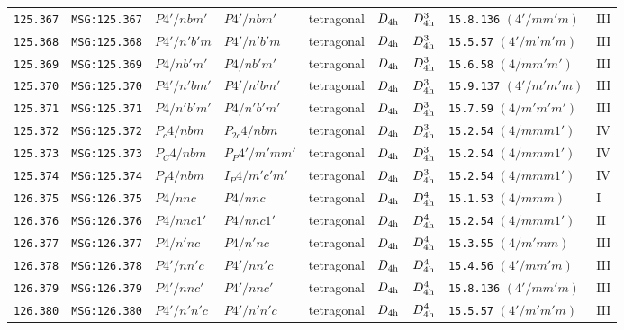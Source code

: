 \documentclass[fleqn,10pt]{jsarticle}
\begin{document}
\begin{center}
\begin{longtable}{lllllllll}
\texttt{125.367} & \texttt{MSG:125.367} & $P4'/nbm'$ & $P4'/nbm'$ & tetragonal & $D_{\rm 4h}$ & $D_{\rm 4h}^{3}$ & \texttt{15.8.136} $(4'/mm'm)$ & III \\
\texttt{125.368} & \texttt{MSG:125.368} & $P4'/n'b'm$ & $P4'/n'b'm$ & tetragonal & $D_{\rm 4h}$ & $D_{\rm 4h}^{3}$ & \texttt{15.5.57} $(4'/m'm'm)$ & III \\
\texttt{125.369} & \texttt{MSG:125.369} & $P4/nb'm'$ & $P4/nb'm'$ & tetragonal & $D_{\rm 4h}$ & $D_{\rm 4h}^{3}$ & \texttt{15.6.58} $(4/mm'm')$ & III \\
\texttt{125.370} & \texttt{MSG:125.370} & $P4'/n'bm'$ & $P4'/n'bm'$ & tetragonal & $D_{\rm 4h}$ & $D_{\rm 4h}^{3}$ & \texttt{15.9.137} $(4'/m'm'm)$ & III \\
\texttt{125.371} & \texttt{MSG:125.371} & $P4/n'b'm'$ & $P4/n'b'm'$ & tetragonal & $D_{\rm 4h}$ & $D_{\rm 4h}^{3}$ & \texttt{15.7.59} $(4/m'm'm')$ & III \\
\texttt{125.372} & \texttt{MSG:125.372} & $P_{c}4/nbm$ & $P_{2c}4/nbm$ & tetragonal & $D_{\rm 4h}$ & $D_{\rm 4h}^{3}$ & \texttt{15.2.54} $(4/mmm1')$ & IV \\
\texttt{125.373} & \texttt{MSG:125.373} & $P_{C}4/nbm$ & $P_{P}4'/m'mm'$ & tetragonal & $D_{\rm 4h}$ & $D_{\rm 4h}^{3}$ & \texttt{15.2.54} $(4/mmm1')$ & IV \\
\texttt{125.374} & \texttt{MSG:125.374} & $P_{I}4/nbm$ & $I_{P}4/m'c'm'$ & tetragonal & $D_{\rm 4h}$ & $D_{\rm 4h}^{3}$ & \texttt{15.2.54} $(4/mmm1')$ & IV \\ \hline
\texttt{126.375} & \texttt{MSG:126.375} & $P4/nnc$ & $P4/nnc$ & tetragonal & $D_{\rm 4h}$ & $D_{\rm 4h}^{4}$ & \texttt{15.1.53} $(4/mmm)$ & I \\
\texttt{126.376} & \texttt{MSG:126.376} & $P4/nnc1'$ & $P4/nnc1'$ & tetragonal & $D_{\rm 4h}$ & $D_{\rm 4h}^{4}$ & \texttt{15.2.54} $(4/mmm1')$ & II \\
\texttt{126.377} & \texttt{MSG:126.377} & $P4/n'nc$ & $P4/n'nc$ & tetragonal & $D_{\rm 4h}$ & $D_{\rm 4h}^{4}$ & \texttt{15.3.55} $(4/m'mm)$ & III \\
\texttt{126.378} & \texttt{MSG:126.378} & $P4'/nn'c$ & $P4'/nn'c$ & tetragonal & $D_{\rm 4h}$ & $D_{\rm 4h}^{4}$ & \texttt{15.4.56} $(4'/mm'm)$ & III \\
\texttt{126.379} & \texttt{MSG:126.379} & $P4'/nnc'$ & $P4'/nnc'$ & tetragonal & $D_{\rm 4h}$ & $D_{\rm 4h}^{4}$ & \texttt{15.8.136} $(4'/mm'm)$ & III \\
\texttt{126.380} & \texttt{MSG:126.380} & $P4'/n'n'c$ & $P4'/n'n'c$ & tetragonal & $D_{\rm 4h}$ & $D_{\rm 4h}^{4}$ & \texttt{15.5.57} $(4'/m'm'm)$ & III \\

\end{longtable}
\end{center}
\end{document}
